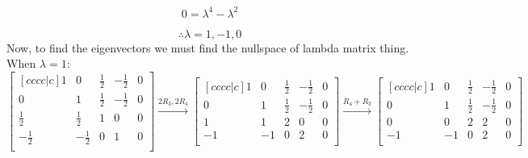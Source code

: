 \documentclass[12pt]{article}
\begin{document}
$$
0=\lambda^4-\lambda^2
$$

$$
\therefore
\lambda = 1, -1, 0
$$
Now, to find the eigenvectors we must find the nullspace of lambda matrix thing.\\
\medskip
When $\lambda=1$:\\
$$
\begin{bmatrix}[cccc|c]
	1 & 0 & \frac{1}{2} & -\frac{1}{2} & 0 \\
	0 & 1 & \frac{1}{2} & -\frac{1}{2} & 0 \\
	\frac{1}{2} & \frac{1}{2} & 1 & 0 & 0 \\
	-\frac{1}{2} & -\frac{1}{2} & 0 & 1 & 0 \\
\end{bmatrix}
\overset{2R_3, 2R_4}{\longrightarrow} 
\begin{bmatrix}[cccc|c]
	1 & 0 & \frac{1}{2} & -\frac{1}{2} & 0 \\
	0 & 1 & \frac{1}{2} & -\frac{1}{2} & 0 \\
	1 & 1 & 2 & 0 & 0 \\
	-1 & -1 & 0 & 2 & 0 \\
\end{bmatrix}
\overset{R_4+R_3}{\longrightarrow} 
\begin{bmatrix}[cccc|c]
	1 & 0 & \frac{1}{2} & -\frac{1}{2} & 0 \\
	0 & 1 & \frac{1}{2} & -\frac{1}{2} & 0 \\
	0 & 0 & 2 & 2 & 0 \\
	-1 & -1 & 0 & 2 & 0 \\
\end{bmatrix}
$$
\end{document}
